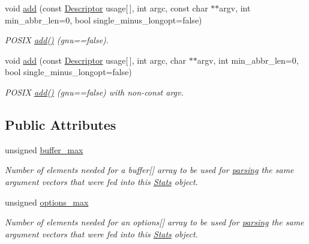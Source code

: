 \begin{DoxyCompactItemize}
void \hyperlink{structoption_1_1Stats_a4fc47be5db7f52016e3142a9b9dd0d1e}{add} (const \hyperlink{structoption_1_1Descriptor}{Descriptor} usage\mbox{[}$\,$\mbox{]}, int argc, const char $\ast$$\ast$argv, int min\+\_\+abbr\+\_\+len=0, bool single\+\_\+minus\+\_\+longopt=false)
\begin{DoxyCompactList}\small\item\em P\+O\+S\+IX \hyperlink{structoption_1_1Stats_aa77e2a8b1704527d2d087820f4456143}{add()} (gnu==false). \end{DoxyCompactList}\item 
\mbox{\label{structoption_1_1Stats_ad659604438f79c79f5bc009f2a16ca92}} 
void \hyperlink{structoption_1_1Stats_ad659604438f79c79f5bc009f2a16ca92}{add} (const \hyperlink{structoption_1_1Descriptor}{Descriptor} usage\mbox{[}$\,$\mbox{]}, int argc, char $\ast$$\ast$argv, int min\+\_\+abbr\+\_\+len=0, bool single\+\_\+minus\+\_\+longopt=false)
\begin{DoxyCompactList}\small\item\em P\+O\+S\+IX \hyperlink{structoption_1_1Stats_aa77e2a8b1704527d2d087820f4456143}{add()} (gnu==false) with non-\/const argv. \end{DoxyCompactList}\end{DoxyCompactItemize}
\subsection*{Public Attributes}
\begin{DoxyCompactItemize}
\item 
unsigned \hyperlink{structoption_1_1Stats_a2c9a7b4174f91ba8bcadaa9ad6f0db06}{buffer\+\_\+max}
\begin{DoxyCompactList}\small\item\em Number of elements needed for a {\ttfamily buffer}\mbox{[}\mbox{]} array to be used for \hyperlink{classoption_1_1Parser_a6e0b5778d1cfbd6cd51240e74d01e138}{parsing} the same argument vectors that were fed into this \hyperlink{structoption_1_1Stats}{Stats} object. \end{DoxyCompactList}\item 
unsigned \hyperlink{structoption_1_1Stats_a8121787feb1c7db84fca3ccb012b0473}{options\+\_\+max}
\begin{DoxyCompactList}\small\item\em Number of elements needed for an {\ttfamily options}\mbox{[}\mbox{]} array to be used for \hyperlink{classoption_1_1Parser_a6e0b5778d1cfbd6cd51240e74d01e138}{parsing} the same argument vectors that were fed into this \hyperlink{structoption_1_1Stats}{Stats} object. \end{DoxyCompactList}\end{DoxyCompactItemize}


